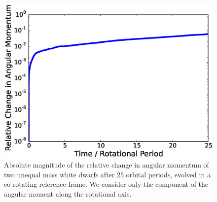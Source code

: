 \documentclass[12pt]{article}
\begin{document}
\begin{figure}[h!]
  \centering
  \includegraphics[scale=0.8,trim=0.1in 0.0in 0.1in 0.1in,clip]{plots/unequal_angular_momentum_rot1}
  \caption[System angular momentum over 25 orbital periods]
          {Absolute magnitude of the relative change in angular momentum of two unequal mass white dwarfs after 25 orbital periods,
           evolved in a co-rotating reference frame. We consider only the component of the angular moment along the rotational
           axis.
           \label{fig:angular_momentum_conservation_unequal}}
\end{figure}
\end{document}
